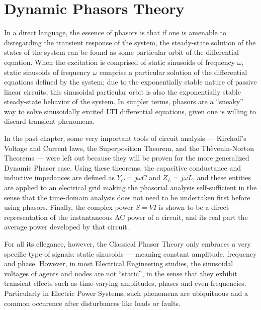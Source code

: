 \chapter{Dynamic Phasors Theory}\label{chapter:dynamic_phasor_theory}

	 In a direct language, the essence of phasors is that if one is amenable to disregarding the transient response of the system, the steady-state solution of the states of the system can be found as some particular orbit of the differential equation. When the excitation is comprised of static sinusoids of frequency $\omega$, static sinusoids of frequency $\omega$ comprise a particular solution of the differential equations defined by the system; due to the exponentially stable nature of passive linear circuits, this sinusoidal particular orbit is also the exponentially stable steady-state behavior of the system. In simpler terms, phasors are a ``sneaky'' way to solve sinusoidally excited LTI differential equations, given one is willing to discard transient phenomena.

	In the past chapter, some very important tools of circuit analysis — Kirchoff's Voltage and Current laws, the Superposition Theorem, and the Thèvenin-Norton Theorems — were left out because they will be proven for the more generalized Dynamic Phasor case. Using these theorems, the capacitive conductance and inductive impedances are defined as $Y_C = j\omega C$ and $Z_L = j\omega L$, and these entities are applied to an electrical grid making the phasorial analysis self-sufficient in the sense that the time-domain analysis does not need to be undertaken first before using phasors. Finally, the complex power $S = V \overline{I}$ is shown to be a direct representation of the instantaneous AC power of a circuit, and its real part the average power developed by that circuit.

	For all its ellegance, however, the Classical Phasor Theory only embraces a very specific type of signals: static sinusoids — meaning constant amplitude, frequency and phase. However, in most Electrical Engineering studies, the sinusoidal voltages of agents and nodes are not ``static'', in the sense that they exhibit transient effects such as time-varying amplitudes, phases and even frequencies. Particularly in Electric Power Systems, such phenomena are ubiquituous and a common occurence after disturbances like loads or faults.

